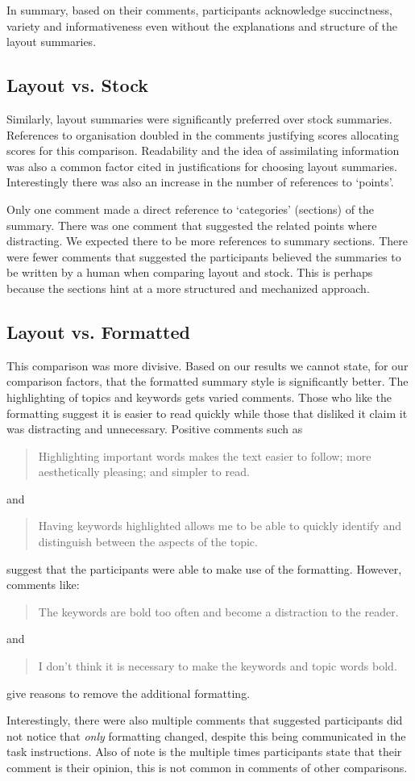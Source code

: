       In summary, based on their comments, participants acknowledge succinctness, variety and informativeness even without the explanations and structure of the layout summaries.

    \tocless\subsection{Layout vs. Stock}
      Similarly, layout summaries were significantly preferred over stock summaries. References to organisation doubled in the comments justifying scores allocating scores for this comparison. Readability and the idea of assimilating information was also a common factor cited in justifications for choosing layout summaries. Interestingly there was also an increase in the number of references to `points'.

      Only one comment made a direct reference to `categories' (sections) of the summary. There was one comment that suggested the related points where distracting. We expected there to be more references to summary sections. There were fewer comments that suggested the participants believed the summaries to be written by a human when comparing layout and stock. This is perhaps because the sections hint at a more structured and mechanized approach.

    \tocless\subsection{Layout vs. Formatted}
      This comparison was more divisive. Based on our results we cannot state, for our comparison factors, that the formatted summary style is significantly better. The highlighting of topics and keywords gets varied comments. Those who like the formatting suggest it is easier to read quickly while those that disliked it claim it was distracting and unnecessary. Positive comments such as \blockquote{Highlighting important words makes the text easier to follow; more aesthetically pleasing; and simpler to read.} and \blockquote{Having keywords highlighted allows me to be able to quickly identify and distinguish between the aspects of the topic.} suggest that the participants were able to make use of the formatting. However, comments like: \blockquote{The keywords are bold too often and become a distraction to the reader.} and \blockquote{I don't think it is necessary to make the keywords and topic words bold.} give reasons to remove the additional formatting.

      Interestingly, there were also multiple comments that suggested participants did not notice that \textit{only} formatting changed, despite this being communicated in the task instructions. Also of note is the multiple times participants state that their comment is their opinion, this is not common in comments of other comparisons.

